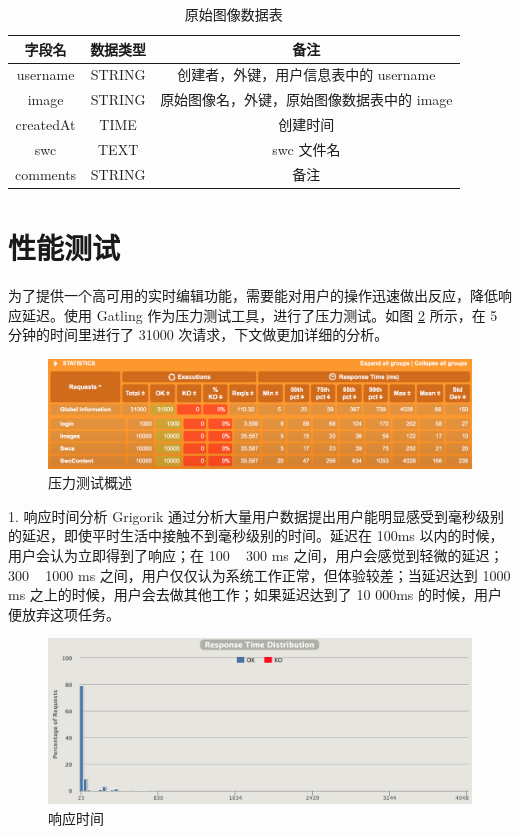\begin{table}
\centering
\caption{原始图像数据表}
\begin{tabular}{|c|c|c|}
			   \hline
                 字段名 & 数据类型 & 备注 \\
               \hline
                 username & STRING & 创建者，外键，用户信息表中的 username \\
               \hline
                 image & STRING & 原始图像名，外键，原始图像数据表中的 image \\
               \hline
                 createdAt & TIME & 创建时间 \\
               \hline
                 swc & TEXT & swc 文件名 \\
               \hline
                 comments & STRING & 备注 \\
               \hline
             \end{tabular}
             \label{swc-table}    
\end{table}

\section{性能测试}
为了提供一个高可用的实时编辑功能，需要能对用户的操作迅速做出反应，降低响应延迟。使用 Gatling 作为压力测试工具，进行了压力测试。如图 \ref{overview} 所示，在 5 分钟的时间里进行了 31000 次请求，下文做更加详细的分析。
\begin{figure}
\centering
\includegraphics[width=148mm]{images/overview}
\caption{压力测试概述}
\label{overview}
\end{figure}

1. 响应时间分析
Grigorik 通过分析大量用户数据提出用户能明显感受到毫秒级别的延迟，即使平时生活中接触不到毫秒级别的时间。延迟在 100ms 以内的时候，用户会认为立即得到了响应；在 100 ~ 300 ms 之间，用户会感觉到轻微的延迟；300 ~ 1000 ms 之间，用户仅仅认为系统工作正常，但体验较差；当延迟达到 1000 ms 之上的时候，用户会去做其他工作；如果延迟达到了 10 000ms 的时候，用户便放弃这项任务。 

\begin{figure}
\centering
\includegraphics[width=148mm]{images/response}
\caption{响应时间}
\label{overview}
\end{figure}

